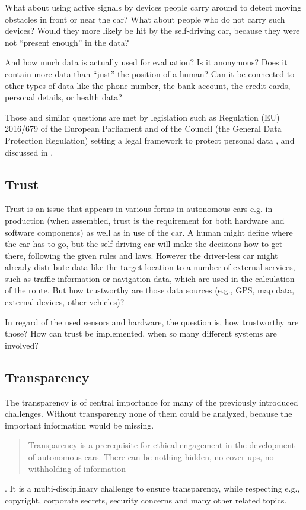 What about using active signals by devices people carry around to detect moving obstacles in front or near the car? What about people who do not carry such devices? Would they more likely be hit by the self-driving car, because they were not \enquote{present enough} in the data?

And how much data is actually used for evaluation? Is it anonymous? Does it contain more data than \enquote{just} the position of a human? Can it be connected to other types of data like the phone number, the bank account, the credit cards, personal details, or health data?

Those and similar questions are met by legislation such as Regulation (EU) 2016/679 of the European Parliament and of the Council (the General Data Protection Regulation) setting a legal framework to protect personal data \cite{EuropeanUnion2016}, and discussed in \cite{doi:10.1093/idpl/ipx005}.


\subsection{Trust}
\label{sec:EAofTC:Trust}

Trust is an issue that appears in various forms in autonomous cars e.g. in production (when assembled, trust is the requirement for both hardware and software components) as well as in use of the car. A human might define where the car has to go, but the self-driving car will make the decisions how to get there, following the given rules and laws. However the driver-less car might already distribute data like the target location to a number of external services, such as traffic information or navigation data, which are used in the calculation of the route. But how trustworthy are those data sources (e.g., GPS, map data, external devices, other vehicles)? 

In regard of the used sensors and hardware, the question is, how trustworthy are those? How can trust be implemented, when so many different systems are involved? 


\subsection{Transparency}
\label{sec:EAofTC:Transparency}

The transparency is of central importance for many of the previously introduced challenges. Without transparency none of them could be analyzed, because the important information would be missing. \blockquote{Transparency is a prerequisite for ethical engagement in the development of autonomous cars. There can be nothing hidden, no cover-ups, no withholding of information} \cite{McBride:2016:EDC:2874239.2874265}. It is a multi-disciplinary challenge to ensure transparency, while respecting e.g., copyright, corporate secrets, security concerns and many other related topics. 


